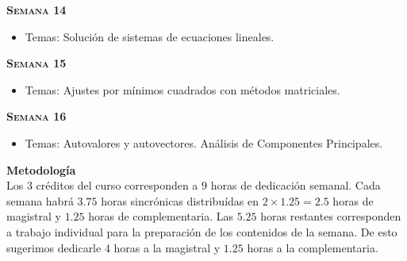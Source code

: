 \documentclass[letterpaper,10pt,onecolumn]{article}
\begin{document}
\noindent\textbf{\textsc{Semana 14}}\\[-0.5cm]
\begin{itemize}
\item Temas: Soluci\'on de sistemas de ecuaciones lineales. 
\\[-0.6cm] 
\end{itemize}


\noindent\textbf{\textsc{Semana 15}}\\[-0.5cm]
\begin{itemize}
\item Temas: Ajustes por m\'inimos cuadrados con m\'etodos matriciales. 
\end{itemize}

\noindent\textbf{\textsc{Semana 16}}\\[-0.5cm]
\begin{itemize}
\item Temas: Autovalores y autovectores. An\'alisis de Componentes Principales. \\[-0.6cm]
\end{itemize}


\vspace*{0.5cm} 
\noindent\textbf{\large {} \quad
  Metodolog\'ia}\\[-0.2cm] 

Los $3$ cr\'editos del curso corresponden a $9$ horas de dedicaci\'on semanal.
Cada semana habr\'a $3.75$ horas sincr\'onicas distribu\'idas en $2\times 1.25=2.5$ horas de magistral 
y $1.25$ horas de complementaria. 
Las $5.25$ horas restantes corresponden a trabajo individual para la
preparaci\'on de los contenidos de la semana.
De esto sugerimos dedicarle $4$ horas a la magistral y $1.25$ horas a
la complementaria.
\end{document}
